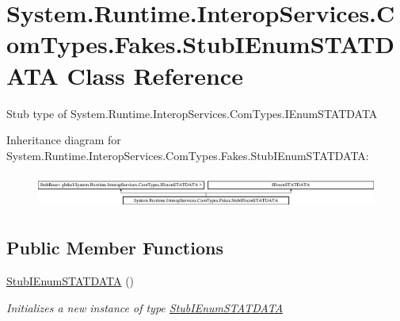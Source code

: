 \hypertarget{class_system_1_1_runtime_1_1_interop_services_1_1_com_types_1_1_fakes_1_1_stub_i_enum_s_t_a_t_d_a_t_a}{\section{System.\-Runtime.\-Interop\-Services.\-Com\-Types.\-Fakes.\-Stub\-I\-Enum\-S\-T\-A\-T\-D\-A\-T\-A Class Reference}
\label{class_system_1_1_runtime_1_1_interop_services_1_1_com_types_1_1_fakes_1_1_stub_i_enum_s_t_a_t_d_a_t_a}
}


Stub type of System.\-Runtime.\-Interop\-Services.\-Com\-Types.\-I\-Enum\-S\-T\-A\-T\-D\-A\-T\-A 


Inheritance diagram for System.\-Runtime.\-Interop\-Services.\-Com\-Types.\-Fakes.\-Stub\-I\-Enum\-S\-T\-A\-T\-D\-A\-T\-A\-:\begin{figure}[H]
\begin{center}
\leavevmode
\includegraphics[height=1.161826cm]{class_system_1_1_runtime_1_1_interop_services_1_1_com_types_1_1_fakes_1_1_stub_i_enum_s_t_a_t_d_a_t_a}
\end{center}
\end{figure}
\subsection*{Public Member Functions}
\begin{DoxyCompactItemize}
\item 
\hyperlink{class_system_1_1_runtime_1_1_interop_services_1_1_com_types_1_1_fakes_1_1_stub_i_enum_s_t_a_t_d_a_t_a_a1db98545e6a087e91b025647d89af432}{Stub\-I\-Enum\-S\-T\-A\-T\-D\-A\-T\-A} ()
\begin{DoxyCompactList}\small\item\em Initializes a new instance of type \hyperlink{class_system_1_1_runtime_1_1_interop_services_1_1_com_types_1_1_fakes_1_1_stub_i_enum_s_t_a_t_d_a_t_a}{Stub\-I\-Enum\-S\-T\-A\-T\-D\-A\-T\-A}\end{DoxyCompactList}\end{DoxyCompactItemize}
